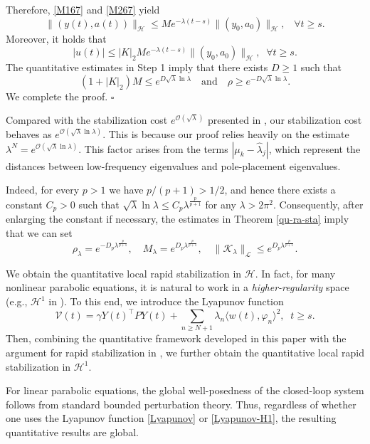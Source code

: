 \documentclass[a4paper]{article}
\numberwithin{equation}{section}
\begin{document}
Therefore, \eqref{M167} and \eqref{M267} yield
\begin{equation*}
\|(y(t),a(t))\|_{\mathcal{H}}\le Me^{-\lambda (t-s)}\|(y_0,a_0)\|_{\mathcal{H}},\;\;\;\forall t\ge s.
\end{equation*}
Moreover, it holds that
$$|u(t)|\le |K|_2Me^{-\lambda (t-s)}\|(y_0,a_0)\|_{\mathcal{H}},\;\;\forall t\ge s.$$
The quantitative estimates in Step 1 imply that there exists $D\ge 1$ such that
$$(1+|K|_2)M\le e^{D{\sqrt{\lambda}\ln\lambda}} \quad \text{and}\quad\rho\ge e^{-D{\sqrt{\lambda}\ln\lambda}}.$$
We complete the proof. \hfill$\square$
\begin{remark}\label{quant-re}
Compared with the stabilization cost $e^{\mathcal{O}(\sqrt{\lambda})}$ presented in \cite{CN,X}, our stabilization cost behaves as $e^{\mathcal{O}(\sqrt{\lambda}\ln\lambda)}$. This is because our proof relies heavily on the estimate $\lambda^N=e^{\mathcal{O}(\sqrt{\lambda}\ln\lambda)}.$  
This factor arises from the terms $|\mu_k-\hat{\lambda}_j|$, which represent the distances between low-frequency eigenvalues and pole-placement eigenvalues.


Indeed, for every $p>1$ we have $p/(p+1)>1/2$, and hence there exists a constant $C_p>0$ such
that
$\sqrt\lambda\ln\lambda\le C_p\lambda^{\frac{p}{p+1}}$ for any $ \lambda>2\pi^2.$
Consequently, after enlarging the constant if necessary, the estimates in Theorem \ref{qu-ra-sta} imply that we can set
$$\rho_{\lambda}=e^{-D_p\lambda^{\frac{p}{p+1}}},\quad
M_{\lambda}=e^{D_p\lambda^{\frac{p}{p+1}}},\quad
\|\mathcal K_\lambda\|_{\mathcal L}\le e^{D_p\lambda^{\frac{p}{p+1}}}.$$
\end{remark}
\begin{remark}
We obtain the quantitative local rapid stabilization in $\mathcal{H}$. In fact, for many nonlinear parabolic equations, it is natural to work in a \textit{higher-regularity} space (e.g., $\mathcal{H}^1$ in \cite{XZ}). To this end, we introduce the Lyapunov function
\begin{equation}\label{Lyapunov-H1}
\mathcal{V}(t)= \gamma Y(t)^{\top}P Y(t)+\sum_{n\ge N+1} \lambda_n \langle w(t),\varphi_n\rangle^2,\;\;t\ge s.
\end{equation}
Then, combining the quantitative framework developed in this paper with the argument for rapid stabilization in \cite{XZ}, we further obtain the quantitative local rapid stabilization in $\mathcal{H}^1$.
\end{remark}
\begin{remark}
For linear parabolic equations, the global well-posedness of the closed-loop system follows from standard bounded perturbation theory. Thus, regardless of whether one uses the Lyapunov function \eqref{Lyapunov} or \eqref{Lyapunov-H1}, the resulting quantitative results are global.
\end{remark}
\end{document}
